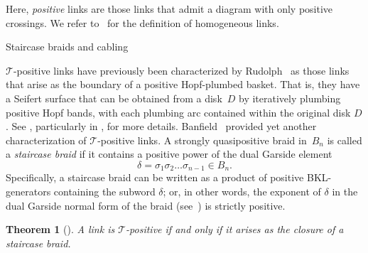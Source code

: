 \documentclass{amsart}
\makeatletter
\renewcommand\subsection{\@startsection{subsection}{2}%
  \z@{-.5\linespacing\@plus-.7\linespacing}{.5\linespacing}%
  {\normalfont\scshape}}
\theoremstyle{definition}
\theoremstyle{remark}
\theoremstyle{plain}
\newtheorem{theorem}[definition]{Theorem}%
\newcommand{\T}{\mathcal{T}}
\makeatother
\begin{document}
Here, \emph{positive} links are those links that admit a diagram with only positive crossings. We refer to~\cite{baader_pos} for the definition of homogeneous links. 

\subsection{Staircase braids and cabling}

$\T$-positive links have previously been characterized by Rudolph~\cite{Rudolph_Hopf_plumbing} as those links that arise as the boundary of a positive Hopf-plumbed basket. That is, they have a Seifert surface that can be obtained from a disk~$D$ by iteratively plumbing positive Hopf bands, with each plumbing arc contained within the original disk $D$. See , particularly  in , for more details. 
%
Banfield~\cite{banfield} provided yet another characterization of $\T$-positive links. 
A strongly quasipositive braid in~$B_n$ is called a \emph{staircase braid} if it contains a positive power of the dual Garside element $$\delta = \sigma_1 \sigma_2 \dots \sigma_{n-1} \in B_n.$$ Specifically, a staircase braid can be written as a product of positive BKL-generators containing the subword $\delta$; or, in other words, the exponent of $\delta$ in the dual Garside normal form of the braid (see~\cite[Theorem~3.10]{birmankolee}) is strictly positive.

\begin{theorem}[{\cite[Corollary 5.11]{banfield}}]\label{thm:banfield}
    A link is $\mathcal{T}$-positive if and only if it arises as the closure of a staircase braid. 
\end{theorem}


\end{document}
